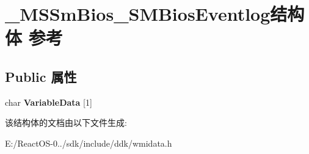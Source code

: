 \hypertarget{struct___m_s_sm_bios___s_m_bios_eventlog}{}\section{\+\_\+\+M\+S\+Sm\+Bios\+\_\+\+S\+M\+Bios\+Eventlog结构体 参考}
\label{struct___m_s_sm_bios___s_m_bios_eventlog}
\subsection*{Public 属性}
\begin{DoxyCompactItemize}
\item 
\mbox{\label{struct___m_s_sm_bios___s_m_bios_eventlog_afce16a7769e88657cfc441f0d0b69f45}} 
char {\bfseries Variable\+Data} \mbox{[}1\mbox{]}
\end{DoxyCompactItemize}


该结构体的文档由以下文件生成\+:\begin{DoxyCompactItemize}
\item 
E\+:/\+React\+O\+S-\/0../sdk/include/ddk/wmidata.\+h\end{DoxyCompactItemize}
